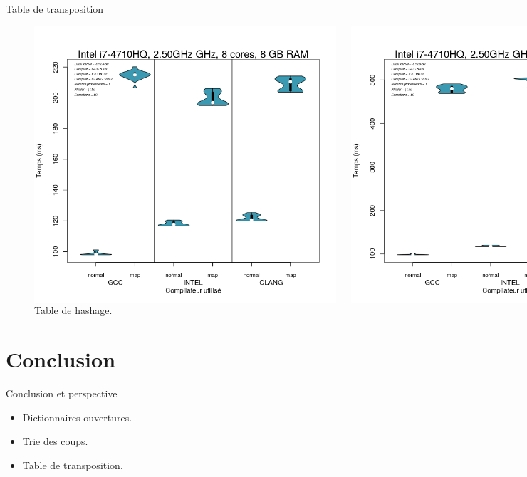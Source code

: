 \documentclass{beamer}
\begin{document}
\begin{frame}{Table de transposition}
	\begin{figure}
	\begin{columns}
      \includegraphics[width=\textwidth]{sorted_map.png}
      \caption{Arbre binaire de recherche.\label{Fig:arbre_binaire}}
      \includegraphics[width=\textwidth]{unsorted_map.png}
      \caption{Table de hashage.\label{Fig:arbre_binaire}}
    \end{columns}	
	\end{figure}
\end{frame}

\section{Conclusion}

\begin{frame}{Conclusion et perspective}
\begin{itemize}
  \item
    Dictionnaires ouvertures.
  \item
    Trie des coups.
  \item
    Table de transposition.
 \end{itemize}	
\end{frame}
\end{document}
